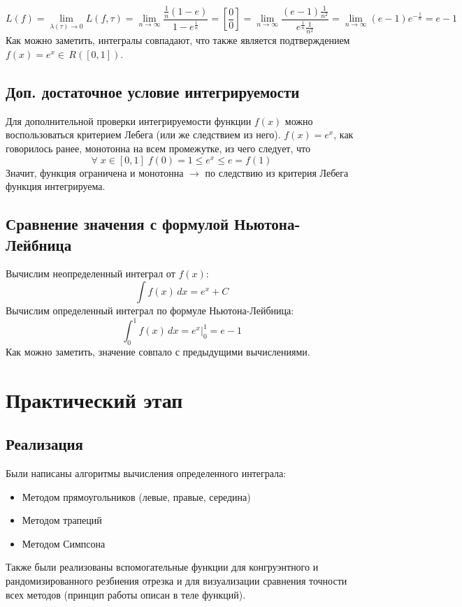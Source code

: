\documentclass[a4paper, 12pt]{report}
\begin{document}
\[
L(f) = \lim_{\lambda(\tau) \rightarrow 0}L(f, \tau) = \lim_{n \rightarrow \infty} \frac{\frac{1}{n}(1 - e)}{1 - e^{\frac{1}{n}}} = [\frac{0}{0}] = \lim_{n \rightarrow \infty} \frac{(e - 1)\frac{1}{n^2}}{e^{\frac{1}{n}}\frac{1}{n^2}} = \lim_{n \rightarrow \infty} (e - 1) e^{-\frac{1}{n}} = e - 1
\]
Как можно заметить, интегралы совпадают, что также является подтверждением $f(x) = e^x \in \, R([0, 1])$. 

\section{Доп. достаточное условие интегрируемости}
Для дополнительной проверки интегрируемости функции $f(x)$ можно воспользоваться критерием Лебега (или же следствием из него). $f(x) = e^x$, как говорилось ранее, монотонна на всем промежутке, из чего следует, что
\[
\forall \; x \in [0,1] \; f(0) = 1 \leq e^x \leq e = f(1)
\]
Значит, функция ограничена и монотонна $\rightarrow$ по следствию из критерия Лебега функция интегрируема.

\section{Сравнение значения с формулой Ньютона-Лейбница}
Вычислим неопределенный интеграл от $f(x)$:
\[
\int f(x)\,dx = e^x + C
\]
Вычислим определенный интеграл по формуле Ньютона-Лейбница:
\[
\int_{0}^{1} f(x)\,dx = e^x \big|_{0}^{1} = e - 1
\]
Как можно заметить, значение совпало с предыдущими вычислениями.

\chapter*{Практический этап}
\setcounter{chapter}{3}
\setcounter{section}{0}

\section{Реализация}
Были написаны алгоритмы вычисления определенного интеграла:

\begin{itemize}
    \item Методом прямоугольников (левые, правые, середина)
    \item Методом трапеций
    \item Методом Симпсона
\end{itemize}

Также были реализованы вспомогательные функции для конгруэнтного и рандомизированного резбиения отрезка и для визуализации сравнения точности всех методов (принцип работы описан в теле функций).
\end{document}
